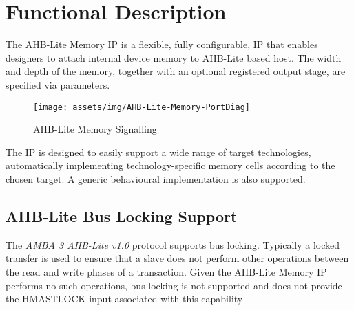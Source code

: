 \chapter{Functional Description}\label{functional-description}

The AHB-Lite Memory IP is a flexible, fully configurable, IP that enables designers to attach internal device memory to AHB-Lite based host. The width and depth of the memory, together with an optional registered output stage, are specified via parameters.

\begin{figure}[th]
	\centering
	\texttt{[image: assets/img/AHB-Lite-Memory-PortDiag]}
	\caption{AHB-Lite Memory Signalling}
	\label{fig:ahb-lite-memory-portdiag}
\end{figure}

The IP is designed to easily support a wide range of target
technologies, automatically implementing technology-specific memory
cells according to the chosen target. A generic behavioural
implementation is also supported.

\section{AHB-Lite Bus Locking Support} \label{ahb-lite-bus-locking-support}

The \emph{AMBA 3 AHB-Lite v1.0} protocol supports bus locking. Typically a locked transfer is used to ensure that a slave does not perform other operations between the read and write phases of a transaction. Given the AHB-Lite Memory IP performs no such operations, bus locking is not supported and does not provide the HMASTLOCK input associated with this capability